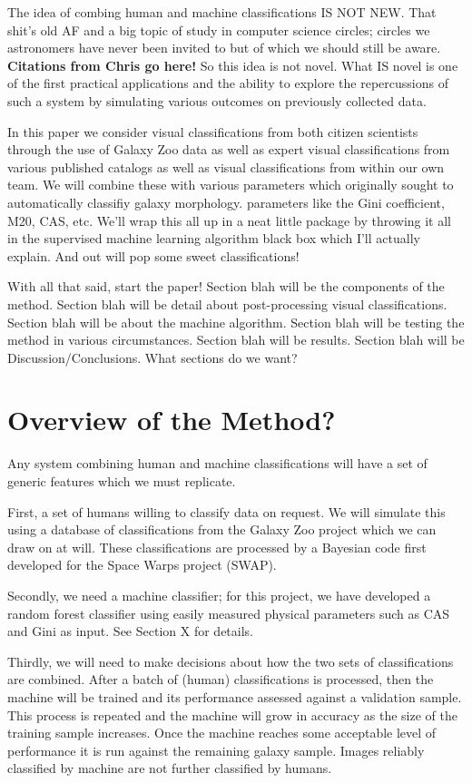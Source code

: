 \documentclass[twocolumn]{aastex6}
\begin{document}
The idea of combing human and machine classifications IS NOT NEW. That shit's
old AF and a big topic of study in computer science circles; circles we astronomers
have never been invited to but of which we should still be aware. \textbf{Citations
from Chris go here!} So this idea is not novel. What IS novel is one of the first practical
applications and the ability to explore the repercussions of such a system by 
simulating various outcomes on previously collected data. 


In this paper we consider visual classifications from both citizen scientists through
the use of Galaxy Zoo data as well as expert visual classifications from various 
published catalogs as well as visual classifications from within our own team. We 
will combine these with various parameters which originally sought to automatically
classifiy galaxy morphology. parameters like the Gini coefficient, M20, CAS, etc. 
We'll wrap this all up in a neat little package by throwing it all in the 
supervised machine learning algorithm black box which I'll actually explain.
And out will pop some sweet classifications! 

With all that said, start the paper! Section blah will be the components of the method. Section blah will be detail about post-processing visual classifications. Section blah will be about the machine algorithm. Section blah will be testing the method in various circumstances. Section blah will be results. Section blah will be Discussion/Conclusions. 
What sections do we want? 




\section{Overview of the Method?}
Any system combining human and machine classifications will have a set of generic features which we must replicate.

First, a set of humans willing to classify data on request. We will simulate this using a database of classifications from the Galaxy Zoo project which we can draw on at will. These classifications are processed by a Bayesian code first developed for the Space Warps project (SWAP).

Secondly, we need a machine classifier; for this project, we have developed a random forest classifier using easily measured physical parameters such as CAS and Gini as input. See Section X for details.

Thirdly, we will need to make decisions about how the two sets of classifications are combined. After a batch of (human) classifications is processed, then the machine will be trained and its performance assessed against a validation sample. This process is repeated and the machine will grow in accuracy as the size of the training sample increases. Once the machine reaches some acceptable level of performance it is run against the remaining galaxy sample. Images reliably classified by machine are not further classified by humans.
\end{document}
